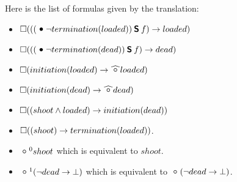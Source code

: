 \begin{itemize}
Here is the list of formulas given by the translation:
\begin{itemize}
  \item $\alwaysF(((\previous \neg termination(loaded)) \since f) \rightarrow loaded)$
  \item $\alwaysF(((\previous \neg termination(dead)) \since f) \rightarrow dead)$
  \item $\alwaysF(initiation(loaded)\rightarrow\wnext loaded)$
  \item $\alwaysF(initiation(dead)\rightarrow\wnext dead)$
  \item $\square((shoot\land loaded)\rightarrow initiation(dead))$
  \item $\square((shoot)\rightarrow termination(loaded))$.
  \item $\next^{0}shoot$ which is equivalent to $shoot$.
  \item $\next^{1}(\neg dead\rightarrow \bot)$ which is equivalent to $\next(\neg dead\rightarrow \bot)$.
\end{itemize}

\end{itemize}
